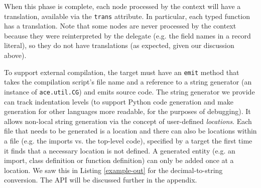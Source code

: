 \documentclass[10pt,preprint]{sigplanconf}
\begin{document}
{When this phase is complete, each node processed by the context will have a translation, available via the \verb|trans| attribute. In particular, each typed function has a translation. Note that some nodes are never processed by the context because they were reinterpreted by the delegate (e.g. the field names in a record literal), so they do not have translations (as expected, given our discussion above).

To support external compilation, the target must have an \verb|emit| method that takes the compilation script's file name and a reference to a string generator (an instance of \verb|ace.util.CG|) and emits source code. The string generator we provide can track indentation levels (to support Python code generation and make generation for other languages more readable, for the purposes of debugging). It allows non-local string generation via the concept of user-defined \emph{locations}.  Each file that needs to be generated is a location and there can also be locations within a file (e.g. the imports vs. the top-level code), specified by a target the first time it finds that a necessary location is not defined. A generated entity (e.g. an import, class definition or function definition) can only be added once at a location. We saw this in Listing \ref{example-out} for the decimal-to-string conversion. The API will be discussed further in the appendix. 
}
\end{document}
